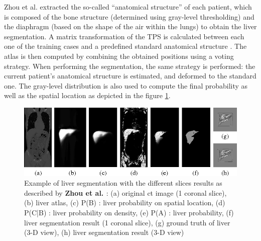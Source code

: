 Zhou et al. \cite{Zhou2006} extracted the so-called ``anatomical structure'' of each
patient, which is composed of the bone structure (determined using
gray-level thresholding) and the diaphragm (based on the shape of the
air within the lungs) to obtain the liver segmentation. A matrix transformation of the TPS is calculated
between each one of the training cases and a predefined standard
anatomical structure \cite{Zhou2005}.
The atlas is then computed by combining the obtained positions using a
voting strategy. When performing the segmentation, the same strategy is
performed: the current patient's anatomical structure is estimated, and
deformed to the standard one. The gray-level distribution is also used
to compute the final probability as well as the spatial location as
depicted in the figure \ref{Zhou2006_Fig4}.
\begin{figure}[th!]
	\centering
	\includegraphics[width=0.9\linewidth]{images/Zhou2006_Fig4}
	\caption{Example of liver segmentation with the different slices results as described by \textbf{Zhou et al. \cite{Zhou2006}}: (a) original \ac{ct} image (1 coronal slice), (b) liver atlas, (c) P(B) : liver probability on spatial location, (d) P(C|B) : liver probability on density, (e) P(A) : liver probability, (f) liver segmentation result (1 coronal slice), (g) ground truth of liver (3-D view), (h) liver segmentation result (3-D view)}
	\label{Zhou2006_Fig4}
\end{figure}

